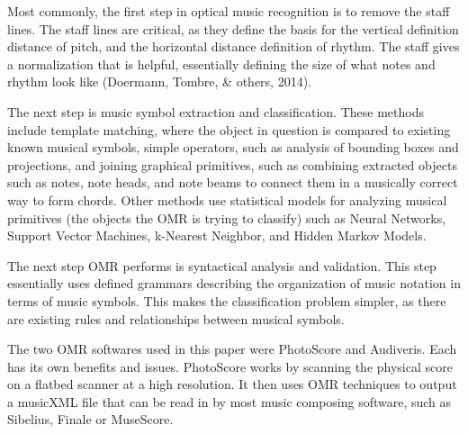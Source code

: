 \documentclass[12pt,twoside]{reedthesis}
\theoremstyle{definition}
\theoremstyle{definition}
\theoremstyle{definition}
\theoremstyle{remark}
\begin{document}
Most commonly, the first step in optical music recognition is to remove
the staff lines. The staff lines are critical, as they define the basis
for the vertical definition distance of pitch, and the horizontal
distance definition of rhythm. The staff gives a normalization that is
helpful, essentially defining the size of what notes and rhythm look
like (Doermann, Tombre, \& others, 2014).

The next step is music symbol extraction and classification. These
methods include template matching, where the object in question is
compared to existing known musical symbols, simple operators, such as
analysis of bounding boxes and projections, and joining graphical
primitives, such as combining extracted objects such as notes, note
heads, and note beams to connect them in a musically correct way to form
chords. Other methods use statistical models for analyzing musical
primitives (the objects the OMR is trying to classify) such as Neural
Networks, Support Vector Machines, k-Nearest Neighbor, and Hidden Markov
Models.

The next step OMR performs is syntactical analysis and validation. This
step essentially uses defined grammars describing the organization of
music notation in terms of music symbols. This makes the classification
problem simpler, as there are existing rules and relationships between
musical symbols.

The two OMR softwares used in this paper were PhotoScore and Audiveris.
Each has its own benefits and issues. PhotoScore works by scanning the
physical score on a flatbed scanner at a high resolution. It then uses
OMR techniques to output a musicXML file that can be read in by most
music composing software, such as Sibelius, Finale or MuseScore.
\end{document}

